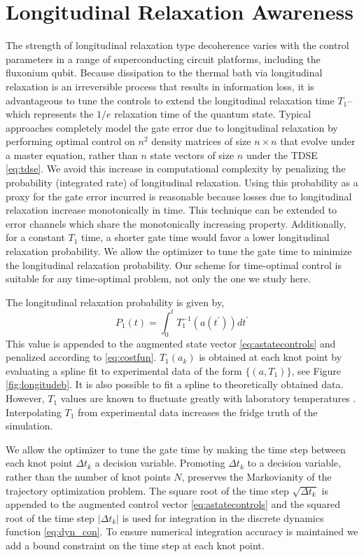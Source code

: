 \section{Longitudinal Relaxation Awareness \label{sec:longitude}}
The strength of longitudinal relaxation type decoherence varies
with the control parameters in a range of superconducting circuit platforms,
including the fluxonium qubit. Because dissipation to the thermal bath
via longitudinal relaxation is an irreversible process that results in information loss,
it is advantageous to tune the controls to extend the longitudinal
relaxation time $T_{1}$--which represents the $1/e$ relaxation time
of the quantum state.
Typical approaches completely model the gate error due to longitudinal
relaxation by performing optimal control on $n^{2}$
density matrices of size $n \times n$ that evolve under a master
equation, rather than $n$ state vectors of size $n$
under the TDSE \eqref{eq:tdse}.
We avoid this increase in computational complexity by
penalizing the probability (integrated rate) of longitudinal relaxation.
Using this probability as a proxy for the gate error incurred
is reasonable because losses due to longitudinal relaxation increase monotonically
in time.
This technique can be extended to
error channels which share the monotonically increasing property.
Additionally, for a constant $T_{1}$ time, a shorter gate time
would favor a lower longitudinal relaxation probability. We allow
the optimizer to tune the gate time to minimize the
longitudinal relaxation probability. Our scheme for time-optimal
control is suitable for any time-optimal problem, not only
the one we study here.

The longitudinal relaxation probability is given by,
\begin{equation}
  P_{1}(t) = \int_{0}^{t} T_{1}^{-1}(a(t^{\prime})) dt^{\prime}
\end{equation}
This value is appended to the augmented state vector \eqref{eq:astatecontrols}
and penalized according to \eqref{eq:costfun}.
$T_{1}(a_{k})$ is obtained at each knot point by evaluating
a spline fit to experimental data of the form $\{(a, T_{1})\}$,
see Figure \ref{fig:longitudeb}.
It is also possible to fit a spline to theoretically obtained data.
However, $T_{1}$ values are known to fluctuate greatly
with laboratory temperatures \cite{klimov2018fluctuations}.
Interpolating $T_{1}$ from experimental data
increases the fridge truth of the simulation.

We allow the optimizer to tune the gate time by
making the time step between each knot point $\Delta t_{k}$
a decision variable. Promoting $\Delta t_{k}$ to a decision variable, rather
than the number of knot points $N$, preserves the
Markovianity of the trajectory
optimization problem. The square root of the time step $\sqrt{\Delta t_{k}}$
is appended to the augmented control vector \eqref{eq:astatecontrols}
and the squared root
of the time step $\lvert \Delta t_{k} \rvert$ is used
for integration in the discrete dynamics function \eqref{eq:dyn_con}.
To ensure numerical
integration accuracy is maintained we add a bound
constraint on the time step at each knot point.

